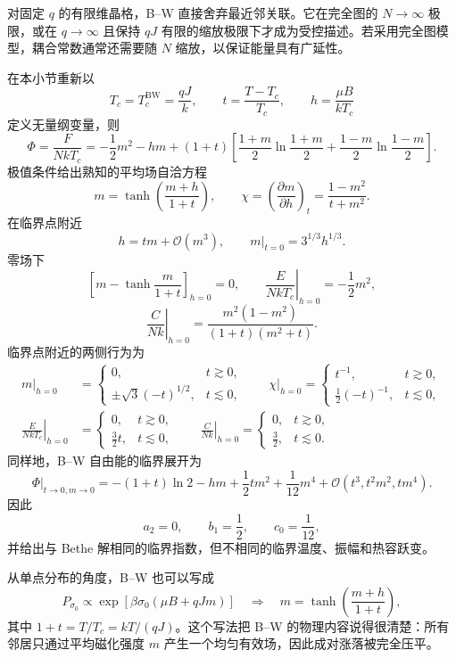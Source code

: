 对固定 \(q\) 的有限维晶格，B--W 直接舍弃最近邻关联。它在完全图的 \(N\to\infty\) 极限，或在 \(q\to\infty\) 且保持 \(qJ\) 有限的缩放极限下才成为受控描述。若采用完全图模型，耦合常数通常还需要随 \(N\) 缩放，以保证能量具有广延性。

在本小节重新以
\begin{equation*}
	T_c=T_c^{\mathrm{BW}}=\frac{qJ}{k},\qquad
	t=\frac{T-T_c}{T_c},\qquad
	h=\frac{\mu B}{kT_c}
\end{equation*}
定义无量纲变量，则
\begin{equation*}
\Phi=\frac F{NkT_c}
=-\frac12m^2-hm
+(1+t)\left[
\frac{1+m}{2}\ln\frac{1+m}{2}
+\frac{1-m}{2}\ln\frac{1-m}{2}
\right].
\end{equation*}
极值条件给出熟知的平均场自洽方程
\begin{equation*}
m=\tanh\left(\frac{m+h}{1+t}\right),
\qquad
\chi=\left(\frac{\partial m}{\partial h}\right)_t
=\frac{1-m^2}{t+m^2}.
\end{equation*}
在临界点附近
\begin{equation*}
h=tm+\mathcal O(m^3),\qquad
\left.m\right|_{t=0}=3^{1/3}h^{1/3}.
\end{equation*}
零场下
\begin{equation*}
\left[
m-\tanh\frac m{1+t}
\right]_{h=0}=0,
\qquad
\left.\frac E{NkT_c}\right|_{h=0}=-\frac12m^2,
\end{equation*}
\begin{equation*}
\left.\frac C{Nk}\right|_{h=0}
=\frac{m^2(1-m^2)}
{(1+t)(m^2+t)}.
\end{equation*}
临界点附近的两侧行为为
\begin{align*}
\left.m\right|_{h=0}
&=
\begin{cases}
0,&t\gtrsim0,\\
\pm\sqrt3(-t)^{1/2},&t\lesssim0,
\end{cases}
\qquad
\left.\chi\right|_{h=0}
=
\begin{cases}
t^{-1},&t\gtrsim0,\\
\frac12(-t)^{-1},&t\lesssim0,
\end{cases}\\
\left.\frac E{NkT_c}\right|_{h=0}
&=
\begin{cases}
0,&t\gtrsim0,\\
\frac32t,&t\lesssim0,
\end{cases}
\qquad
\left.\frac C{Nk}\right|_{h=0}
=
\begin{cases}
0,&t\gtrsim0,\\
\frac32,&t\lesssim0.
\end{cases}
\end{align*}
同样地，B--W 自由能的临界展开为
\begin{equation*}
\left.\Phi\right|_{t\to0,m\to0}
=-(1+t)\ln2-hm+\frac12tm^2+\frac1{12}m^4
+\mathcal O(t^3,t^2m^2,tm^4).
\end{equation*}
因此
\begin{equation*}
a_2=0,\qquad b_1=\frac12,\qquad c_0=\frac1{12},
\end{equation*}
并给出与 Bethe 解相同的临界指数，但不相同的临界温度、振幅和热容跃变。

从单点分布的角度，B--W 也可以写成
\begin{equation*}
	P_{\sigma_0}\propto
	\exp\left[\beta\sigma_0(\mu B+qJm)\right]
\quad\Longrightarrow\quad
m=\tanh\left(\frac{m+h}{1+t}\right),
\end{equation*}
其中 \(1+t=T/T_c=kT/(qJ)\)。这个写法把 B--W 的物理内容说得很清楚：所有邻居只通过平均磁化强度 \(m\) 产生一个均匀有效场，因此成对涨落被完全压平。
